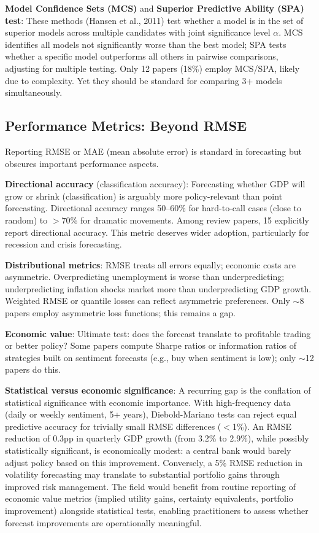 \documentclass[11pt,twocolumn]{article}
\begin{document}
\textbf{Model Confidence Sets (MCS)} and \textbf{Superior Predictive Ability (SPA) test}: These methods (Hansen et al., 2011) test whether a model is in the set of superior models across multiple candidates with joint significance level $\alpha$. MCS identifies all models not significantly worse than the best model; SPA tests whether a specific model outperforms all others in pairwise comparisons, adjusting for multiple testing. Only 12 papers (18\%) employ MCS/SPA, likely due to complexity. Yet they should be standard for comparing 3+ models simultaneously.

\subsection{Performance Metrics: Beyond RMSE}

Reporting RMSE or MAE (mean absolute error) is standard in forecasting but obscures important performance aspects.

\textbf{Directional accuracy} (classification accuracy): Forecasting whether GDP will grow or shrink (classification) is arguably more policy-relevant than point forecasting. Directional accuracy ranges 50--60\% for hard-to-call cases (close to random) to $>70\%$ for dramatic movements. Among review papers, 15 explicitly report directional accuracy. This metric deserves wider adoption, particularly for recession and crisis forecasting.

\textbf{Distributional metrics}: RMSE treats all errors equally; economic costs are asymmetric. Overpredicting unemployment is worse than underpredicting; underpredicting inflation shocks market more than underpredicting GDP growth. Weighted RMSE or quantile losses can reflect asymmetric preferences. Only $\sim$8 papers employ asymmetric loss functions; this remains a gap.

\textbf{Economic value}: Ultimate test: does the forecast translate to profitable trading or better policy? Some papers compute Sharpe ratios or information ratios of strategies built on sentiment forecasts (e.g., buy when sentiment is low); only $\sim$12 papers do this.

\textbf{Statistical versus economic significance}: A recurring gap is the conflation of statistical significance with economic importance. With high-frequency data (daily or weekly sentiment, 5+ years), Diebold-Mariano tests can reject equal predictive accuracy for trivially small RMSE differences ($<$1\%). An RMSE reduction of 0.3pp in quarterly GDP growth (from 3.2\% to 2.9\%), while possibly statistically significant, is economically modest: a central bank would barely adjust policy based on this improvement. Conversely, a 5\% RMSE reduction in volatility forecasting may translate to substantial portfolio gains through improved risk management. The field would benefit from routine reporting of economic value metrics (implied utility gains, certainty equivalents, portfolio improvement) alongside statistical tests, enabling practitioners to assess whether forecast improvements are operationally meaningful.
\end{document}
